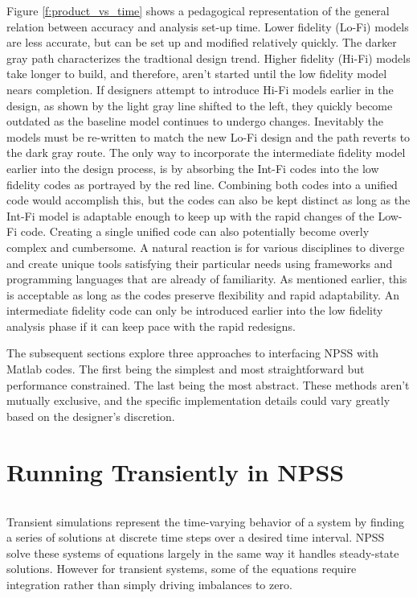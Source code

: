 \documentclass[heading.tex]{subfiles}
\begin{document}
Figure \ref{f:product_vs_time} shows a pedagogical representation of the general relation between accuracy and analysis set-up time. Lower fidelity (Lo-Fi) models are less accurate, but can be set up and modified relatively quickly. The darker gray path characterizes the tradtional design trend. Higher fidelity (Hi-Fi) models take longer to build, and therefore, aren't started until the low fidelity model nears completion. If designers attempt to introduce Hi-Fi models earlier in the design, as shown by the light gray line shifted to the left, they quickly become outdated as the baseline model continues to undergo changes. Inevitably the models must be re-written to match the new Lo-Fi design and the path reverts to the dark gray route. The only way to incorporate the intermediate fidelity model earlier into the design process, is by absorbing the Int-Fi codes into the low fidelity codes as portrayed by the red line. Combining both codes into a unified code would accomplish this, but the codes can also be kept distinct as long as the Int-Fi model is adaptable enough to keep up with the rapid changes of the Low-Fi code. Creating a single unified code can also potentially become overly complex and cumbersome. A natural reaction is for various disciplines to diverge and create unique tools satisfying their particular needs using frameworks and programming languages that are already of familiarity. As mentioned earlier, this is acceptable as long as the codes preserve flexibility and rapid adaptability. An intermediate fidelity code can only be introduced earlier into the low fidelity analysis phase if it can keep pace with the rapid redesigns.

The subsequent sections explore three approaches to interfacing NPSS with Matlab codes. The first being the simplest and most straightforward but performance constrained. The last being the most abstract. These methods aren't mutually exclusive, and the specific implementation details could vary greatly based on the designer's discretion. 


\section{Running Transiently in NPSS}


\begin{adjustwidth}{-1cm}{-1cm}
 \inputminted[]{c++}{code/transient1}
 \end{adjustwidth} 


Transient simulations represent the time-varying behavior of a system by finding a series of solutions at discrete time steps over a desired time interval. NPSS solve these systems of equations largely in the same way it handles steady-state solutions. However for transient systems, some of the equations require integration rather than simply driving imbalances to zero. 
\end{document}
